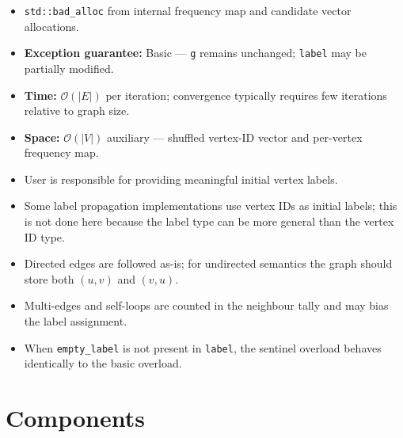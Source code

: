 \begin{itemdescr}
\begin{itemize}
            \end{itemize}
      \pnum\throws
            \begin{itemize}
                  \item \lstinline{std::bad_alloc} from internal frequency map and candidate vector allocations.
                  \item \textbf{Exception guarantee:} Basic --- \lstinline{g} remains unchanged;
                        \lstinline{label} may be partially modified.
            \end{itemize}
      \pnum\complexity
            \begin{itemize}
                  \item \textbf{Time:} $\mathcal{O}(|E|)$ per iteration; convergence typically
                        requires few iterations relative to graph size.
                  \item \textbf{Space:} $\mathcal{O}(|V|)$ auxiliary --- shuffled vertex-ID vector and
                        per-vertex frequency map.
            \end{itemize}
      \pnum\remarks
            \begin{itemize}
                  \item User is responsible for providing meaningful initial vertex labels.
                  \item Some label propagation implementations use vertex IDs as initial labels;
                        this is not done here because the label type can be more general than the 
                        vertex ID type.
                  \item Directed edges are followed as-is; for undirected semantics the graph
                        should store both $(u,v)$ and $(v,u)$.
                  \item Multi-edges and self-loops are counted in the neighbour tally and may
                        bias the label assignment.
                  \item When \lstinline{empty_label} is not present in \lstinline{label}, the
                        sentinel overload behaves identically to the basic overload.
            \end{itemize}
\end{itemdescr}

\section{Components}

